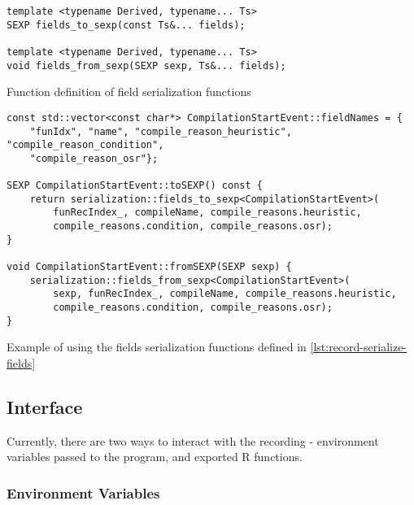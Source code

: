 \begin{listing}
	\begin{verbatim}
template <typename Derived, typename... Ts>
SEXP fields_to_sexp(const Ts&... fields);

template <typename Derived, typename... Ts>
void fields_from_sexp(SEXP sexp, Ts&... fields);
  \end{verbatim}
	\caption{Function definition of field serialization functions}\label{lst:record-serialize-fields}
\end{listing}

\begin{listing}
	\begin{verbatim}
const std::vector<const char*> CompilationStartEvent::fieldNames = {
    "funIdx", "name", "compile_reason_heuristic", "compile_reason_condition",
    "compile_reason_osr"};

SEXP CompilationStartEvent::toSEXP() const {
    return serialization::fields_to_sexp<CompilationStartEvent>(
        funRecIndex_, compileName, compile_reasons.heuristic,
        compile_reasons.condition, compile_reasons.osr);
}

void CompilationStartEvent::fromSEXP(SEXP sexp) {
    serialization::fields_from_sexp<CompilationStartEvent>(
        sexp, funRecIndex_, compileName, compile_reasons.heuristic,
        compile_reasons.condition, compile_reasons.osr);
}
  \end{verbatim}
	\caption{Example of using the fields serialization functions defined in \ref{lst:record-serialize-fields}}\label{lst:record-serialize-compstart}
\end{listing}

\subsection{Interface}

Currently, there are two ways to interact with the recording - environment variables passed to the program, and exported R functions.

\subsubsection*{Environment Variables}

